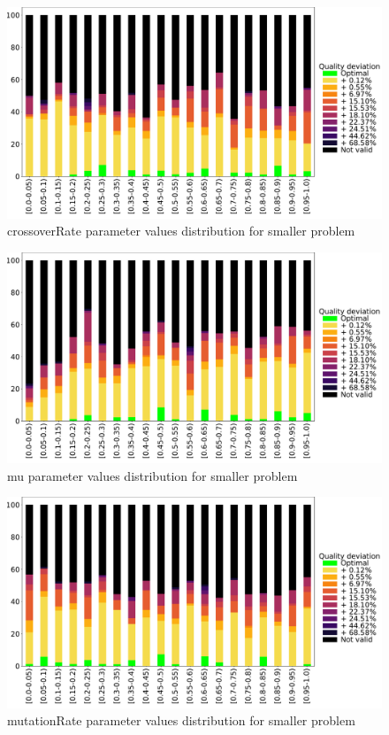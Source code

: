 \begin{figure}
	\centering
	\includegraphics[width=\textwidth]{images/DistrObj/crossoverRate.pdf}
	\caption[crossoverRate parameter values distribution for smaller problem]{crossoverRate parameter values distribution for smaller problem}  
	\label{fig:crossoverRate_Obj}
\end{figure}

\begin{figure}
	\centering
	\includegraphics[width=\textwidth]{images/DistrObj/mu.pdf}
	\caption[mu parameter values distribution for smaller problem]{mu parameter values distribution for smaller problem}
	\label{fig:mu_Obj}
\end{figure}

\begin{figure}
	\centering
	\includegraphics[width=\textwidth]{images/DistrObj/mutationRate.pdf}
	\caption[mutationRate parameter values distribution for smaller problem]{mutationRate parameter values distribution for smaller problem}
	\label{fig:mutationRate_Obj}
\end{figure}

